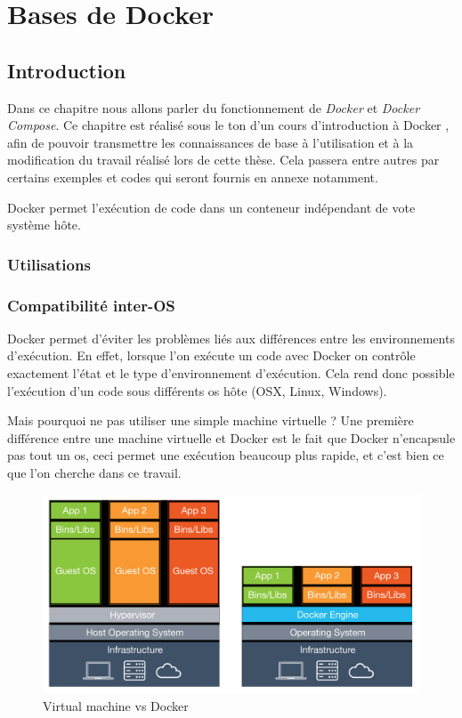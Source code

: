 \chapter{Bases de Docker}
\label{ch:docker}

\section{Introduction}
Dans ce chapitre nous allons parler du fonctionnement de \emph{Docker} et \emph{Docker Compose}. Ce chapitre est réalisé sous le ton d'un cours d'introduction à Docker \cite{1}, afin de pouvoir transmettre les connaissances de base à l'utilisation et à la modification du travail réalisé lors de cette thèse. Cela passera entre autres par certains exemples et codes qui seront fournis en annexe notamment.

Docker permet l'exécution de code dans un conteneur indépendant de vote système hôte. 

\subsection{Utilisations}
\subsection{Compatibilité inter-OS}
Docker permet d'éviter les problèmes liés aux différences entre les environnements d'exécution. En effet, lorsque l'on exécute un code avec Docker on contrôle exactement l'état et le type d'environnement d'exécution. Cela rend donc possible l'exécution d'un code sous différents \gls{os} hôte (OSX, Linux, Windows).

Mais pourquoi ne pas utiliser une simple machine virtuelle ? Une première différence entre une machine virtuelle et Docker est le fait que Docker n'encapsule pas tout un \gls{os}, ceci permet une exécution beaucoup plus rapide, et c'est bien ce que l'on cherche dans ce travail.

\begin{figure}[H] 
\centering 
\includegraphics[width=1\columnwidth]{img/vm-vs-docker-container} 
\caption[vm vs Docker]{Virtual machine vs Docker}
\label{fig:vs} 
\end{figure}

